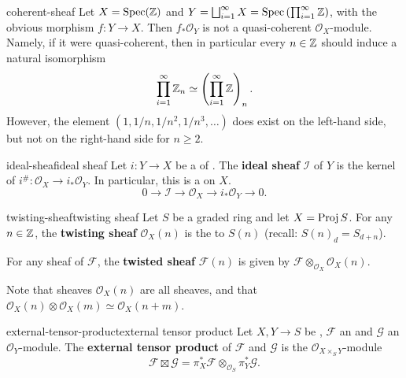 \begin{example}{coherent-sheaf}
    Let $X = \operatorname{Spec}(\mathbb{Z})$ and $Y = \bigsqcup_{i = 1}^{\infty} X = \operatorname{Spec}\left(\prod_{i = 1}^\infty \mathbb{Z} \right)$, with the obvious morphism $f : Y \to X$. Then $f_* \mathcal{O}_Y$ is not a quasi-coherent $\mathcal{O}_X$-module. Namely, if it were quasi-coherent, then in particular every $n \in \mathbb{Z}$ should induce a natural isomorphism
    \[ \prod_{i = 1}^{\infty} \mathbb{Z}_n \simeq \left(\prod_{i = 1}^{\infty} \mathbb{Z} \right)_n . \]
    However, the element $(1, 1/n, 1/n^2, 1/n^3, \ldots)$ does exist on the left-hand side, but not on the right-hand side for $n \ge 2$.
\end{example}

\begin{topic}{ideal-sheaf}{ideal sheaf}
    Let $i : Y \to X$ be a  of . The \textbf{ideal sheaf} $\mathcal{I}$ of $Y$ is the kernel of $i^\# : \mathcal{O}_X \to i_* \mathcal{O}_Y$. In particular, this is a  on $X$.
    \[ 0 \to \mathcal{I} \to \mathcal{O}_X \to i_* \mathcal{O}_Y \to 0 . \]
\end{topic}

\begin{topic}{twisting-sheaf}{twisting sheaf}
    Let $S$ be a graded ring and let $X = \operatorname{Proj} S$. For any $n \in \mathbb{Z}$, the \textbf{twisting sheaf} $\mathcal{O}_X(n)$ is the  to $S(n)$ (recall: $S(n)_d = S_{d + n}$).
    
    For any sheaf of  $\mathcal{F}$, the \textbf{twisted sheaf} $\mathcal{F}(n)$ is given by $\mathcal{F} \otimes_{\mathcal{O}_X} \mathcal{O}_X(n)$.
    
    Note that sheaves $\mathcal{O}_X(n)$ are all  sheaves, and that $\mathcal{O}_X(n) \otimes \mathcal{O}_X(m) \simeq \mathcal{O}_X(n + m)$.
\end{topic}

\begin{topic}{external-tensor-product}{external tensor product}
    Let $X, Y \to S$ be , $\mathcal{F}$ an  and $\mathcal{G}$ an $\mathcal{O}_Y$-module. The \textbf{external tensor product} of $\mathcal{F}$ and $\mathcal{G}$ is the $\mathcal{O}_{X \times_S Y}$-module
    \[ \mathcal{F} \boxtimes \mathcal{G} = \pi_X^* \mathcal{F} \otimes_{\mathcal{O}_S} \pi_Y^* \mathcal{G} . \]
\end{topic}

